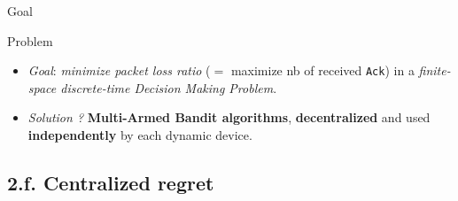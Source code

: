 \documentclass[12pt,english,ignorenonframetext,]{beamer}
\providecommand{\tightlist}{%
  \setlength{\itemsep}{0pt}\setlength{\parskip}{0pt}}
\begin{document}
\begin{frame}[fragile]{Goal}

\begin{block}{Problem}

\begin{itemize}\tightlist
\item
  \emph{Goal}: \emph{minimize packet loss ratio} (\(=\) maximize nb of
  received \texttt{Ack}) in a \emph{finite-space discrete-time Decision
  Making Problem}.
\item
  \emph{Solution ?} \textbf{Multi-Armed Bandit algorithms},
  \textbf{decentralized} and used \textbf{independently} by each dynamic
  device.
\end{itemize}

\end{block}




\end{frame}



\subsection{\hfill{}2.f. Centralized regret\hfill{}}
\end{document}

